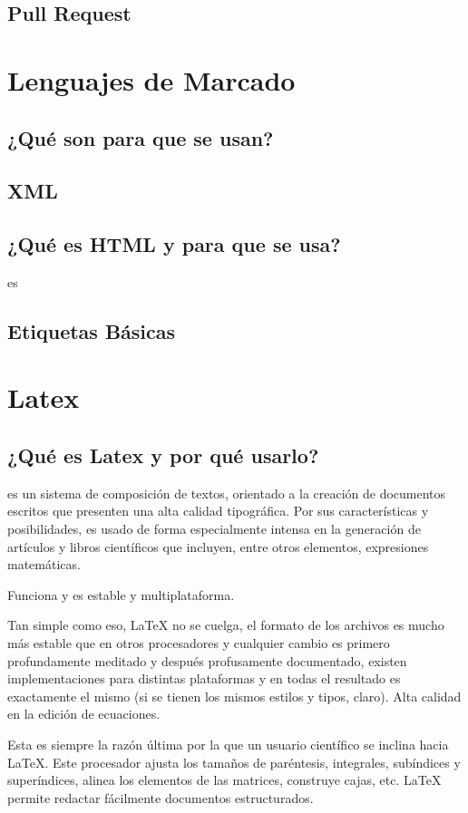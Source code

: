 \documentclass[11pt,letterpaper]{article}
\begin{document}
\subsection{Pull Request}
\section{Lenguajes de Marcado}
\subsection{¿Qué son para que se usan?}
\subsection{XML}
\subsection{¿Qué es HTML y para que se usa?}
es\subsection{Etiquetas Básicas}

\section{Latex}
\subsection{¿Qué es Latex y por qué usarlo?}
es un sistema de composición de textos, orientado a la creación de documentos escritos que presenten una alta calidad tipográfica. Por sus características y posibilidades, es usado de forma especialmente intensa en la generación de artículos y libros científicos que incluyen, entre otros elementos, expresiones matemáticas.


Funciona y es estable y multiplataforma.

    Tan simple como eso, LaTeX no se cuelga, el formato de los archivos es mucho más estable que en otros procesadores y cualquier cambio es primero profundamente meditado y después profusamente documentado, existen implementaciones para distintas plataformas y en todas el resultado es exactamente el mismo (si se tienen los mismos estilos y tipos, claro).
Alta calidad en la edición de ecuaciones.

    Esta es siempre la razón última por la que un usuario científico se inclina hacia LaTeX. Este procesador ajusta los tamaños de paréntesis, integrales, subíndices y superíndices, alinea los elementos de las matrices, construye cajas, etc.
LaTeX permite redactar fácilmente documentos estructurados.
\end{document}
